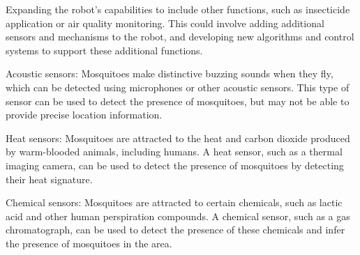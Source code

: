 \documentclass[11pt]{article}
\begin{document}
	Expanding the robot's capabilities to include other functions, such as insecticide application or air quality monitoring. This could involve adding additional sensors and mechanisms to the robot, and developing new algorithms and control systems to support these additional functions.
	
	
	Acoustic sensors: Mosquitoes make distinctive buzzing sounds when they fly, which can be detected using microphones or other acoustic sensors. This type of sensor can be used to detect the presence of mosquitoes, but may not be able to provide precise location information.
	
	Heat sensors: Mosquitoes are attracted to the heat and carbon dioxide produced by warm-blooded animals, including humans. A heat sensor, such as a thermal imaging camera, can be used to detect the presence of mosquitoes by detecting their heat signature.
	
	Chemical sensors: Mosquitoes are attracted to certain chemicals, such as lactic acid and other human perspiration compounds. A chemical sensor, such as a gas chromatograph, can be used to detect the presence of these chemicals and infer the presence of mosquitoes in the area.
\end{document}
